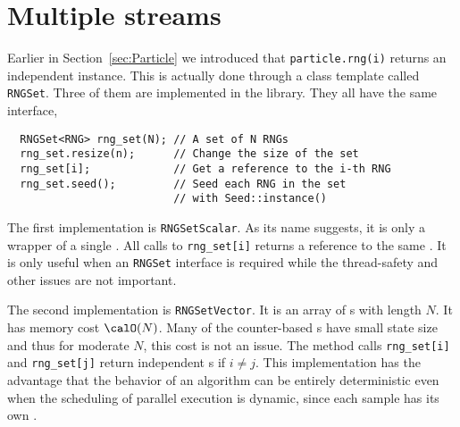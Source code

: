 \section{Multiple \protect\rng streams}
\label{sec:Multiple RNG streams}

Earlier in Section~\ref{sec:Particle} we introduced that \verb|particle.rng(i)|
returns an independent \rng instance. This is actually done through a class
template called \verb|RNGSet|. Three of them are implemented in the library.
They all have the same interface,
\begin{Verbatim}
  RNGSet<RNG> rng_set(N); // A set of N RNGs
  rng_set.resize(n);      // Change the size of the set
  rng_set[i];             // Get a reference to the i-th RNG
  rng_set.seed();         // Seed each RNG in the set
                          // with Seed::instance()
\end{Verbatim}
The first implementation is \verb|RNGSetScalar|. As its name suggests, it is
only a wrapper of a single \rng. All calls to \verb|rng_set[i]| returns a
reference to the same \rng. It is only useful when an \verb|RNGSet| interface
is required while the thread-safety and other issues are not important.

The second implementation is \verb|RNGSetVector|. It is an array of \rng{}s
with length $N$. It has memory cost $\calO(N)$. Many of the counter-based
\rng{}s have small state size and thus for moderate $N$, this cost is not an
issue. The method calls \verb|rng_set[i]| and \verb|rng_set[j]| return
independent \rng{}s if $i \ne j$. This implementation has the advantage that
the behavior of an algorithm can be entirely deterministic even when the
scheduling of parallel execution is dynamic, since each sample has its own
\rng.

